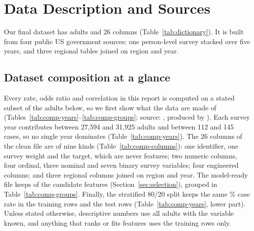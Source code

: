 \section{Data Description and Sources}\label{sec:data}

Our final dataset has \nAdults adults and 26 columns (Table~\ref{tab:dictionary}). It is built from four public US government sources: one person-level survey stacked over five years, and three regional tables joined on region and year.

\subsection*{Dataset composition at a glance}\label{sec:composition}

Every rate, odds ratio and correlation in this report is computed on a stated subset of the adults below, so we first show what the data are made of (Tables~\ref{tab:comp-years}--\ref{tab:comp-groups}; source: , produced by ). Each survey year contributes between 27,594 and 31,925 adults and between 112 and 145 cases, so no single year dominates (Table~\ref{tab:comp-years}). The 26 columns of the clean file are of nine kinds (Table~\ref{tab:comp-columns}): one identifier, one survey weight and the target, which are never features; two numeric columns, four ordinal, three nominal and seven binary survey variables; four engineered columns; and three regional columns joined on region and year. The model-ready file keeps \nFeatures of the \nCandidates candidate features (Section~\ref{sec:selection}), grouped in Table~\ref{tab:comp-groups}. Finally, the stratified 80/20 split keeps the same \sampleRate\% case rate in the \nTrain training rows and the \nTest test rows (Table~\ref{tab:comp-years}, lower part). Unless stated otherwise, descriptive numbers use all \nAdults adults with the variable known, and anything that ranks or fits features uses the training rows only.

\begin{table}[htbp]
\centering\small
\caption{Adults and lung-cancer cases per survey year, and in the train / test split (unweighted).}\label{tab:comp-years}

\end{table}

\begin{table}[htbp]
\centering\small
\caption{The 26 columns of the clean dataset by type.}\label{tab:comp-columns}

\end{table}

